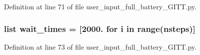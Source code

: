 Definition at line 71 of file user\-\_\-input\-\_\-full\-\_\-battery\-\_\-\-G\-I\-T\-T.\-py.

\hypertarget{namespaceuser__input__full__battery___g_i_t_t_ae584b229c7b1ea3d8330e6038884ffd3}{
\subsubsection[{wait\-\_\-times}]{\setlength{\rightskip}{0pt plus 5cm}list wait\-\_\-times = \mbox{[}2000. for i in range({\bf nsteps})\mbox{]}}}\label{namespaceuser__input__full__battery___g_i_t_t_ae584b229c7b1ea3d8330e6038884ffd3}


Definition at line 73 of file user\-\_\-input\-\_\-full\-\_\-battery\-\_\-\-G\-I\-T\-T.\-py.

